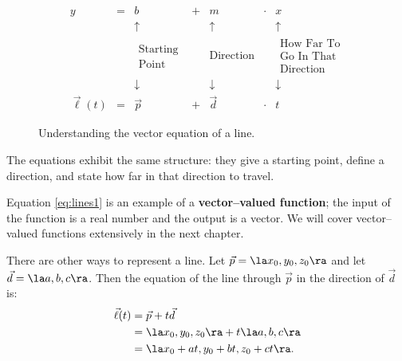 \begin{figure}[!hb]
\begin{center}
\iflatexml
\[
\begin{array}{ccccccc}
y&=&b&+&m&\cdot&x \\
&&\uparrow&&\uparrow&&\uparrow \\
&&\begin{gathered}\text{Starting}\\[-1ex]\text{Point}\end{gathered}
&&\text{Direction}&&
\begin{gathered}
\text{How Far To}\\[-1ex]\text{Go In That}\\[-1ex]\text{Direction}
\end{gathered} \\
&&\downarrow&&\downarrow&&\downarrow \\
\vec\ell(t)&=&\vec p&+&\vec d&\cdot&t
\end{array}
\]
\else
{}
\fi
\captionsetup{type=figure}%
\caption{Understanding the vector equation of a line.}
\label{fig:lines_eq}
\end{center}
\end{figure}

The equations exhibit the same structure: they give a starting point, define a direction, and state how far in that direction to travel.

Equation \eqref{eq:lines1} is an example of a \textbf{vector--valued function}; the input of the function is a real number and the output is a vector. We will cover vector--valued functions extensively in the next chapter.

There are other ways to represent a line. Let $\vec p = \la x_0,y_0,z_0\ra$ and let $\vec d = \la a,b,c\ra$. Then the equation of the line through $\vec p$ in the direction of $\vec d$ is:
\begin{align*}
\vec\ell(t) &= \vec p + t\vec d \\
						&= \la x_0,y_0,z_0\ra + t\la a,b,c\ra \\
						&= \la x_0 + at, y_0+bt, z_0+ct\ra.
\end{align*}

